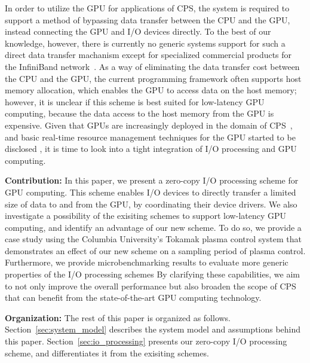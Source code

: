 In order to utilize the GPU for applications of CPS, the system is
required to support a method of bypassing data transfer between the CPU
and the GPU, instead connecting the GPU and I/O devices directly.
To the best of our knowledge, however, there is currently no generic
systems support for such a direct data transfer machanism except for
specialized commercial products for the InfiniBand
network~\cite{GPUDirect}.
As a way of eliminating the data transfer cost between the CPU and the
GPU, the current programming framework often supports host memory
allocation, which enables the GPU to access data on the host memory;
however, it is unclear if this scheme is best suited for low-latency GPU
computing, because the data access to the host memory from the GPU is
expensive.
Given that GPUs are increasingly deployed in the domain of
CPS~\cite{Hirabayashi_REACTION12, Mangharam11, McNaughton_ICRA11,
Michel_IROS07}, 
and basic real-time resource management techniques for the GPU started to be
disclosed \cite{Elliott_RTS12, Elliott_ECRTS12, Kato_RTAS11,
Kato_RTSS11, Kato_ATC11, Kato_ATC12, Liu_PACT12}, it is time to look
into a tight integration of I/O processing and GPU computing.

\textbf{Contribution:}
In this paper, we present a zero-copy I/O processing scheme for GPU
computing.
This scheme enables I/O devices to directly transfer a limited size of
data to and from the GPU, by coordinating their device drivers. 
We also investigate a possibility of the exisiting schemes to support
low-latency GPU computing, and identify an advantage of our new scheme.
To do so, we provide a case study using the Columbia University's
Tokamak plasma control system that demonstrates an effect of our
new scheme on a sampling period of plasma control.
Furthermore, we provide microbenchmarking results to evaluate more
generic properties of the I/O processing schemes
By clarifying these capabilities, we aim to not only improve the overall
performance but also broaden the scope of CPS that can benefit from the
state-of-the-art GPU computing technology.

\textbf{Organization:}
The rest of this paper is organized as follows.
Section~\ref{sec:system_model} describes the system model and
assumptions behind this paper.
Section~\ref{sec:io_processing} presents our zero-copy I/O processing
scheme, and differentiates it from the exisiting schemes.